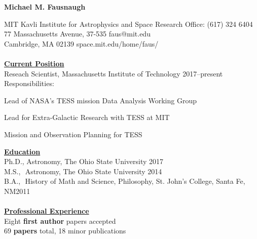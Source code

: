 \documentclass[letterpaper,11pt]{article}
\begin{document}
\begin{center}
\huge\bfseries{Michael M. Fausnaugh}
\end{center}

\noindent MIT Kavli Institute for Astrophysics and Space Research \hfill Office: (617) 324 6404 \\
77 Massachusetts Avenue, 37-535  \hfill faus@mit.edu\\
Cambridge, MA 02139 \hfill space.mit.edu/home/faus/
\\
\\
\underline{\textbf{Current Position}} \\
Reseach Scientist, Massachusetts Institute of Technology \hfill 2017--present\\
Responsibilities: \begin{compactitem}
   \item Lead of NASA's TESS mission Data Analysis Working Group
   \item Lead for Extra-Galactic Research with TESS at MIT
   \item Mission and Observation Planning for TESS
   \end{compactitem}	
\underline{\textbf{Education}}    \\
Ph.D., Astronomy, The Ohio State University \hfill 2017\\
M.S.,  \,\,Astronomy, The Ohio State University \hfill 2014\\
B.A., \,\,History of Math and Science, Philosophy, St. John's College, Santa Fe, NM\hfill 2011\\
\\
\noindent\underline{\textbf{Professional Experience}}\\ 
 Eight \textbf{first author} papers accepted \\
 69 \textbf{papers} total,  18 minor publications\\ %
\end{document}
